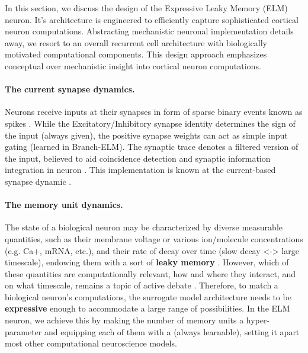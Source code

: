 \documentclass{article} \usepackage{iclr2024_doc_style,times}
\begin{document}
In this section, we discuss the design of the Expressive Leaky Memory (ELM) neuron. It's architecture is engineered to efficiently capture sophisticated cortical neuron computations. Abstracting mechanistic neuronal implementation details away, we resort to an overall recurrent cell architecture with biologically motivated computational components. This design approach emphasizes conceptual over mechanistic insight into cortical neuron computations.

\paragraph{\textcolor{greenVar}{The current synapse dynamics.}}
\label{the_synapse_dynamcis}
Neurons receive inputs at their synapses in form of sparse binary events known as spikes \cite{kandel2000principles}. While the Excitatory/Inhibitory synapse identity determines the sign of the input (always given), the positive synapse weights can act as simple input gating  (learned in Branch-ELM). The synaptic trace  denotes a filtered version of the input, believed to aid coincidence detection and synaptic information integration in neuron \cite{konig1996integrator}. This implementation is known at the current-based synapse dynamic \cite{dayan2005theoretical}.

\paragraph{\textcolor{blueVar}{The memory unit dynamics.}}
\label{the_memory_unit_dynamics}
The state of a biological neuron may be characterized by diverse measurable quantities, such as their membrane voltage or various ion/molecule concentrations (e.g. Ca+, mRNA, etc.), and their rate of decay over time (slow decay <-> large timescale), endowing them with a sort of \textbf{leaky memory} \cite{kandel2000principles,dayan2005theoretical}. However, which of these quantities are computationally relevant, how and where they interact, and on what timescale, remains a topic of active debate \cite{aru2020cellular,herz2006modeling,almog2016realistic,koch1997computation,chavlis2021drawing,cavanagh2020diversity,gjorgjieva2016computational}. Therefore, to match a biological neuron's computations, the surrogate model architecture needs to be \textbf{expressive} enough to accommodate a large range of possibilities. In the ELM neuron, we achieve this by making the number of memory units  a hyper-parameter and equipping each of them with a  (always learnable), setting it apart most other computational neuroscience models.
\end{document}
